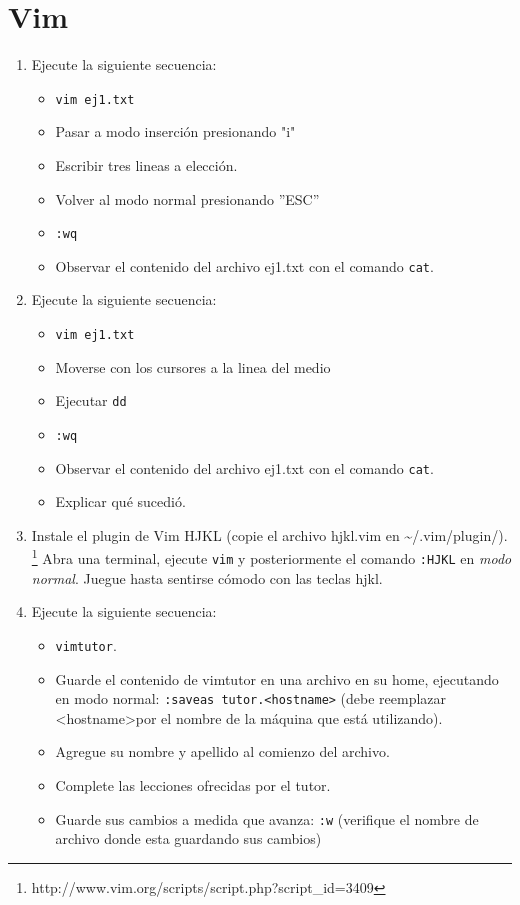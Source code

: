 \documentclass[12pt]{article}
\begin{document}
\section*{Vim}
\begin{enumerate}
\item Ejecute la siguiente secuencia:
	\begin{itemize}
	\item \texttt{vim ej1.txt}
        \item Pasar a modo inserción presionando "i"
        \item Escribir tres lineas a elección. 
        \item Volver al modo normal presionando ''ESC''
        \item \texttt{:wq}
	\item Observar el contenido del archivo ej1.txt con el comando \texttt{cat}. 
	\end{itemize}
\item Ejecute la siguiente secuencia:
	\begin{itemize}
        \item \texttt{vim ej1.txt}
        \item Moverse con los cursores a la linea del medio
        \item Ejecutar \texttt{dd}
        \item \texttt{:wq}
	\item Observar el contenido del archivo ej1.txt con el comando \texttt{cat}. 
        \item Explicar qué sucedió. 
	\end{itemize}
\item Instale el plugin de Vim HJKL (copie el archivo hjkl.vim en \textasciitilde/.vim/plugin/). 
 \footnote{http://www.vim.org/scripts/script.php?script\_id=3409}
Abra una terminal, ejecute \texttt{vim} y posteriormente el comando \texttt{:HJKL} en \textit{modo normal}. 
Juegue hasta sentirse cómodo con las teclas hjkl. 
\item Ejecute la siguiente secuencia:
	\begin{itemize}
	\item \texttt{vimtutor}. 
	\item Guarde el contenido de vimtutor en una archivo en su home, ejecutando en modo normal: \texttt{:saveas tutor.\textless hostname\textgreater} (debe reemplazar \textless hostname\textgreater por el nombre de la máquina que está utilizando).
	\item Agregue su nombre y apellido al comienzo del archivo.
	\item Complete las lecciones ofrecidas por el tutor. 
	\item Guarde sus cambios a medida que avanza: \texttt{:w} (verifique el nombre de archivo donde esta guardando sus cambios) 
	\end{itemize}
\end{enumerate}
\end{document}
